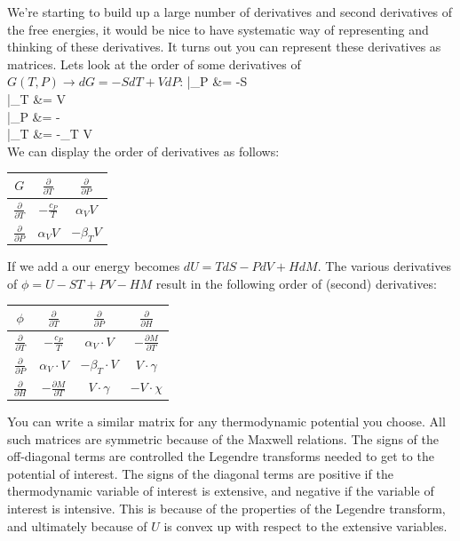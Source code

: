 \documentclass[12pt]{article}
\begin{document}
We're starting to build up a large number of derivatives and second derivatives of the free energies, it would be nice to have systematic way of representing and thinking of these derivatives. It turns out you can represent these derivatives as matrices. Lets look at the order of some derivatives of $G(T,P) \rightarrow dG = -S dT + V dP$:
\eqs
{}|_P &= -S\\
|_T &= V\\
|_P &= -\\
|_T &= -\beta_T V\\
\eqe
We can display the order of derivatives as follows:\\
\begin{center}
\begin{tabular}{c | c | c}
 $G$ & $\frac{\partial}{\partial T}$ & $\frac{\partial}{\partial P}$\\ \hline
 $\frac{\partial}{\partial T}$ & $-\frac{c_P}{T}$ & $\alpha_V V$\\ \hline
 $\frac{\partial}{\partial P}$ & $\alpha_V V$ & $-\beta_T V$
\end{tabular}
\end{center}
If we add a  our energy becomes $dU = TdS - PdV + H dM$.  The various derivatives of $\phi = U - ST + PV - HM$ result in the following order of (second) derivatives:
\begin{center}
\begin{tabular}{c | c | c | c}
$\phi$ & $\frac{\partial}{\partial T}$ & $\frac{\partial}{\partial P}$& $\frac{\partial}{\partial H}$\\ \hline
$\frac{\partial}{\partial T}$ & $-\frac{c_P}{T}$ & $\alpha_V \cdot V$ & $-\frac{\partial M}{\partial T}$\\ \hline
$\frac{\partial}{\partial P}$ & $\alpha_V \cdot V$ & $-\beta_T \cdot V$ & $V \cdot \gamma$\\ \hline
$\frac{\partial}{\partial H}$ & $-\frac{\partial M}{\partial T}$ & $V \cdot \gamma$ & $-V \cdot \chi$
\end{tabular}
\end{center}
You can write a similar matrix for any thermodynamic potential you choose. All such matrices are symmetric because of the Maxwell relations. The signs of the off-diagonal terms are controlled the Legendre transforms needed to get to the potential of interest. The signs of the diagonal terms are positive if the thermodynamic variable of interest is extensive, and negative if the variable of interest is intensive. This is because of the properties of the Legendre transform, and ultimately because of $U$ is convex up with respect to the extensive variables.
\end{document}
